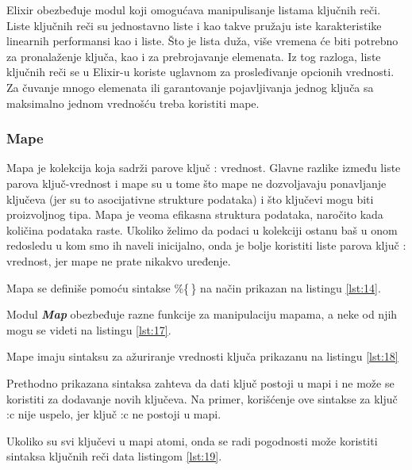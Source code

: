 \documentclass[12pt,oneside]{memoir}
\begin{document}
Elixir obezbeđuje modul koji omogućava manipulisanje listama ključnih reči. Liste ključnih reči su jednostavno liste i kao takve pružaju iste karakteristike linearnih performansi kao i liste. Što je lista duža, više vremena će biti potrebno za pronalaženje ključa, kao i za prebrojavanje elemenata. Iz tog razloga, liste ključnih reči se u Elixir-u koriste uglavnom za prosleđivanje opcionih vrednosti. Za čuvanje mnogo elemenata ili garantovanje pojavljivanja jednog ključa sa maksimalno jednom vrednošću treba koristiti mape.
 
\subsubsection{Mape}
Mapa je kolekcija koja sadrži parove ključ : vrednost. Glavne razlike između liste parova ključ-vrednost i mape su u tome što mape ne dozvoljavaju ponavljanje ključeva (jer su to asocijativne strukture podataka) i što ključevi mogu biti proizvoljnog tipa. Mapa je veoma efikasna struktura podataka, naročito kada količina podataka raste. Ukoliko želimo da podaci u kolekciji ostanu baš u onom redosledu u kom smo ih naveli inicijalno, onda je bolje koristiti liste parova ključ : vrednost, jer mape ne prate nikakvo uređenje.

Mapa se definiše pomoću sintakse \%\{\,\} na način prikazan na listingu \ref{lst:14}.



Modul \textit{\textbf{Map}} obezbeđuje razne funkcije za manipulaciju mapama, a neke od njih mogu se videti na listingu \ref{lst:17}.



Mape imaju sintaksu za ažuriranje vrednosti ključa prikazanu na listingu \ref{lst:18}



\noindent Prethodno prikazana sintaksa zahteva da dati ključ postoji u mapi i ne može se koristiti za dodavanje novih ključeva. Na primer, korišćenje ove sintakse za ključ :c nije uspelo, jer ključ :c ne postoji u mapi.



Ukoliko su svi ključevi u mapi atomi, onda se radi pogodnosti može koristiti sintaksa ključnih reči data listingom \ref{lst:19}.
\end{document}
